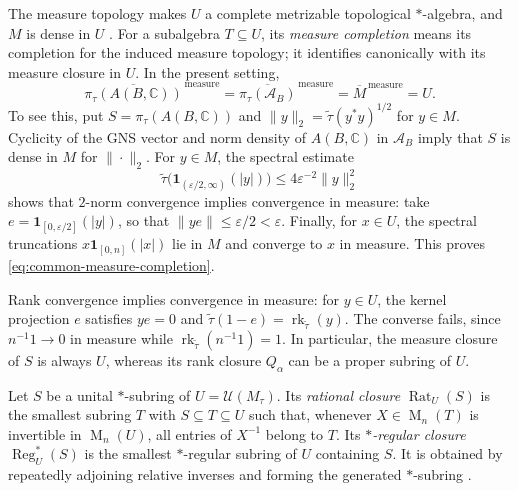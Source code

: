 \documentclass[11pt]{amsart}
\DeclareMathOperator{\rk}{rk}
\DeclareMathOperator{\Mat}{M}
\theoremstyle{definition}
\theoremstyle{remark}
\begin{document}
The measure topology makes $U$ a complete metrizable topological
$*$-algebra, and $M$ is dense in $U$
\cite{Nelson1974,Nayak2019}.
For a subalgebra $T\subseteq U$, its \emph{measure completion}
means its completion for the induced measure topology; it identifies
canonically with its measure closure in $U$.
In the present setting,
\begin{equation}\label{eq:common-measure-completion}
 \overline{\pi_\tau(A(B,\mathbb C))}^{\,\mathrm{measure}}
 =\overline{\pi_\tau(\mathcal A_B)}^{\,\mathrm{measure}}
 =\overline M^{\,\mathrm{measure}}=U.
\end{equation}
To see this, put $S=\pi_\tau(A(B,\mathbb C))$ and
$\|y\|_2=\widetilde\tau(y^*y)^{1/2}$ for $y\in M$.
Cyclicity of the GNS vector and norm density of
$A(B,\mathbb C)$ in $\mathcal A_B$ imply that $S$ is dense in
$M$ for $\|\cdot\|_2$.
For $y\in M$, the spectral estimate
\[
 \widetilde\tau\bigl(\mathbf 1_{(\varepsilon/2,\infty)}(|y|)\bigr)
 \leq4\varepsilon^{-2}\|y\|_2^2
\]
shows that $2$-norm convergence implies convergence in measure:
take $e=\mathbf 1_{[0,\varepsilon/2]}(|y|)$, so that
$\|ye\|\leq\varepsilon/2<\varepsilon$.
Finally, for $x\in U$, the spectral truncations
$x\mathbf 1_{[0,n]}(|x|)$ lie in $M$ and converge to $x$ in measure.
This proves \eqref{eq:common-measure-completion}.

Rank convergence implies convergence in measure: for $y\in U$,
the kernel projection $e$ satisfies $ye=0$ and
$\widetilde\tau(1-e)=\rk_{\widetilde\tau}(y)$.
The converse fails, since $n^{-1}1\to0$ in measure while
$\rk_{\widetilde\tau}(n^{-1}1)=1$.
In particular, the measure closure of $S$ is always $U$, whereas
its rank closure $Q_\alpha$ can be a proper subring of $U$.


Let $S$ be a unital $*$-subring of $U=\mathcal U(M_\tau)$.
Its \emph{rational closure} $\operatorname{Rat}_U(S)$ is the
smallest subring $T$ with $S\subseteq T\subseteq U$ such that,
whenever $X\in\Mat_n(T)$ is invertible in $\Mat_n(U)$,
all entries of $X^{-1}$ belong to $T$.
Its \emph{$*$-regular closure} $\operatorname{Reg}^{*}_U(S)$
is the smallest $*$-regular subring of $U$ containing $S$.
It is obtained by repeatedly adjoining relative inverses and
forming the generated $*$-subring
\cite[Proposition~6.2]{AraGoodearl2017}.
\end{document}
